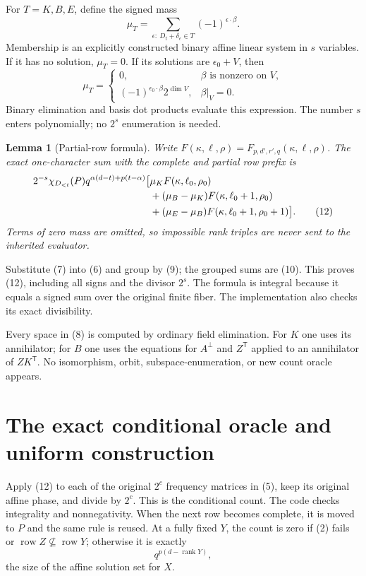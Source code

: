 \documentclass[11pt]{article}
\newtheorem{lemma}[theorem]{Lemma}
\newcommand{\rank}{\operatorname{rank}}
\newcommand{\row}{\operatorname{row}}
\begin{document}
For $T=K,B,E$, define the signed mass
\[
 \mu_T=\sum_{\epsilon:\ D_t+\delta_\epsilon\in T}
                    (-1)^{\epsilon\cdot\beta}.                \tag{10}
\]
Membership is an explicitly constructed binary affine linear system in
$s$ variables. If it has no solution, $\mu_T=0$. If its solutions are
$\epsilon_0+V$, then
\[
 \mu_T=
 \begin{cases}
 0,&\beta\text{ is nonzero on }V,\\
 (-1)^{\epsilon_0\cdot\beta}2^{\dim V},&\beta|_V=0.
 \end{cases}                                                 \tag{11}
\]
Binary elimination and basis dot products evaluate this expression. The
number $s$ enters polynomially; no $2^s$ enumeration is needed.

\begin{lemma}[Partial-row formula]
Write $F(\kappa,\ell,\rho)=F_{p,d',r',q}(\kappa,\ell,\rho)$. The exact
one-character sum with the complete and partial row prefix is
\begin{align}
 2^{-s}\chi_{D_{<t}}(P)q^{\alpha(d-t)+p(t-\alpha)}
 \bigl[&
 \mu_K F(\kappa,\ell_0,\rho_0) \notag\\
 &+(\mu_B-\mu_K)F(\kappa,\ell_0+1,\rho_0) \notag\\
 &+(\mu_E-\mu_B)F(\kappa,\ell_0+1,\rho_0+1)\bigr].
 \tag{12}
\end{align}
Terms of zero mass are omitted, so impossible rank triples are never sent
to the inherited evaluator.
\end{lemma}
Substitute (7) into (6) and group by (9); the grouped sums are (10).
This proves (12), including all signs and the divisor $2^s$. The formula is
integral because it equals a signed sum over the original finite fiber.
The implementation also checks its exact divisibility.

Every space in (8) is computed by ordinary field elimination. For $K$ one
uses its annihilator; for $B$ one uses the equations for $A^\perp$ and
$Z^{\mathsf T}$ applied to an annihilator of $ZK^{\mathsf T}$. No isomorphism,
orbit, subspace-enumeration, or new count oracle appears.

\section{The exact conditional oracle and uniform construction}

Apply (12) to each of the original $2^c$ frequency matrices in (5), keep its
original affine phase, and divide by $2^c$. This is the conditional count.
The code checks integrality and nonnegativity. When the next row becomes
complete, it is moved to $P$ and the same rule is reused. At a fully fixed
$Y$, the count is zero if (2) fails or $\row Z\nsubseteq\row Y$; otherwise
it is exactly
\[
 q^{p(d-\rank Y)},                                           \tag{13}
\]
the size of the affine solution set for $X$.
\end{document}
